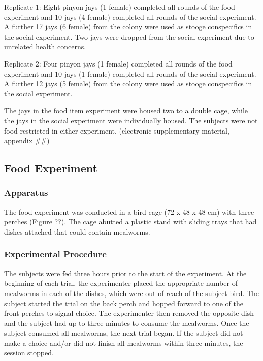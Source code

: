 \documentclass[
  ,doc,floatsintext]{apa6}
\begin{document}
Replicate 1: Eight pinyon jays (1 female) completed all rounds of the food experiment and 10 jays (4 female) completed all rounds of the social experiment. A further 17 jays (6 female) from the colony were used as stooge conspecifics in the social experiment. Two jays were dropped from the social experiment due to unrelated health concerns.

Replicate 2: Four pinyon jays (1 female) completed all rounds of the food experiment and 10 jays (1 female) completed all rounds of the social experiment. A further 12 jays (5 female) from the colony were used as stooge conspecifics in the social experiment.

The jays in the food item experiment were housed two to a double cage, while the jays in the social experiment were individually housed. The subjects were not food restricted in either experiment. (electronic supplementary material, appendix \#\#)

\hypertarget{food-experiment}{%
\subsection{Food Experiment}\label{food-experiment}}

\hypertarget{apparatus}{%
\subsubsection{Apparatus}\label{apparatus}}

The food experiment was conducted in a bird cage (72 x 48 x 48 cm) with three perches (Figure ??). The cage abutted a plastic stand with sliding trays that had dishes attached that could contain mealworms.

\hypertarget{experimental-procedure}{%
\subsubsection{Experimental Procedure}\label{experimental-procedure}}

The subjects were fed three hours prior to the start of the experiment. At the beginning of each trial, the experimenter placed the appropriate number of mealworms in each of the dishes, which were out of reach of the subject bird. The subject started the trial on the back perch and hopped forward to one of the front perches to signal choice. The experimenter then removed the opposite dish and the subject had up to three minutes to consume the mealworms. Once the subject consumed all mealworms, the next trial began. If the subject did not make a choice and/or did not finish all mealworms within three minutes, the session stopped.
\end{document}

